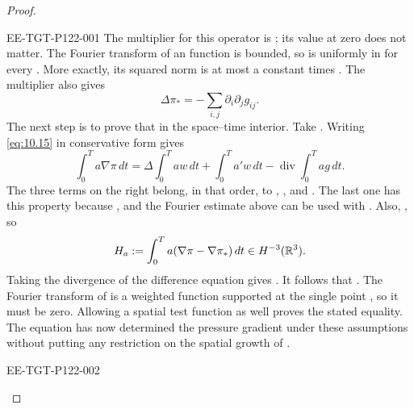 \begin{proof}
%
\begin{EESegment}{EE-TGT-P122-001}
The multiplier for this operator is
; its value at zero does not matter. The
Fourier transform of an  function is bounded, so
 is uniformly in
 for every . More
exactly, its squared norm is at most a constant times
. The multiplier also
gives
\[
  \Delta\pi_*=-\sum_{i,j}\partial_i\partial_jg_{ij}.
\]
The next step is to prove that  in the
space--time interior. Take . Writing
\eqref{eq:10.15} in conservative form gives
\[
  \int_0^T a\nabla\pi\,dt
  =\Delta\int_0^T aw\,dt+\int_0^T a'w\,dt
   -\operatorname{div}\int_0^T ag\,dt.
\]
The three terms on the right belong, in that order, to
, , and
. The last one has this property because
, and the Fourier estimate above can be
used with . Also,
, so
\[
  H_a:=\int_0^T a(\nabla\pi-\nabla\pi_*)\,dt\in H^{-3}(\mathbb{R}^3).
\]
Taking the divergence of the difference equation gives
.
It follows that . The Fourier transform of
 is a weighted  function supported
at the single point , so it must be zero. Allowing a spatial
test function as well proves the stated equality. The equation has now determined the
pressure gradient under these assumptions without putting any restriction on the spatial
growth of .
\end{EESegment}

\begin{EESegment}{EE-TGT-P122-002}

\end{EESegment}
\end{proof}

